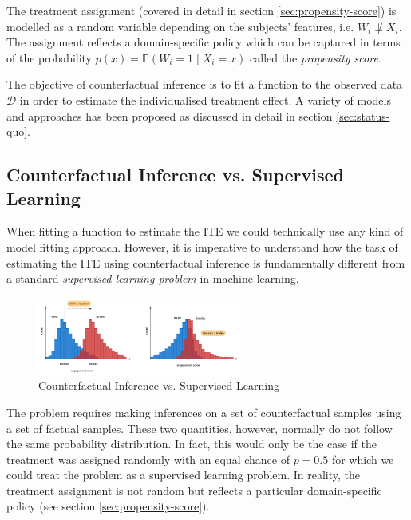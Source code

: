 The treatment assignment (covered in detail in section \ref{sec:propensity-score}) is modelled as a random variable depending on the subjects' features, i.e. $W_i \not \perp X_i$. The assignment reflects a domain-specific policy which can be captured in terms of the probability $p(x) = \mathbb{P}(W_i = 1 \mid X_i = x)$ called the \emph{propensity score}.

The objective of counterfactual inference is to fit a function to the observed data $\mathcal{D}$ in order to estimate the individualised treatment effect. A variety of models and approaches has been proposed as discussed in detail in section \ref{sec:status-quo}.


\subsection{Counterfactual Inference vs. Supervised Learning} \label{sec:cfi-vs-supervised-learning}
When fitting a function to estimate the ITE we could technically use any kind of model fitting approach. However, it is imperative to understand how the task of estimating the ITE using counterfactual inference is fundamentally different from a standard \emph{supervised learning problem} in machine learning.

\begin{figure}
	\centering
	\includegraphics[width=0.6\textwidth]{figures/chapter-2/counterfactual-vs-supervised-learning.png}
	\caption{Counterfactual Inference vs. Supervised Learning}\label{fig:counterfactual-inference-vs-supervised-learning}   
\end{figure}


The problem requires making inferences on a set of counterfactual samples using a set of factual
samples. These two quantities, however, normally do not follow the same probability distribution. In fact, this would only be the case if the treatment was assigned randomly with an equal chance of $p = 0.5$ for which we could treat the problem as a supervised learning problem.  In reality, the treatment assignment is not random but reflects a particular domain-specific policy (see section \ref{sec:propensity-score}). 


